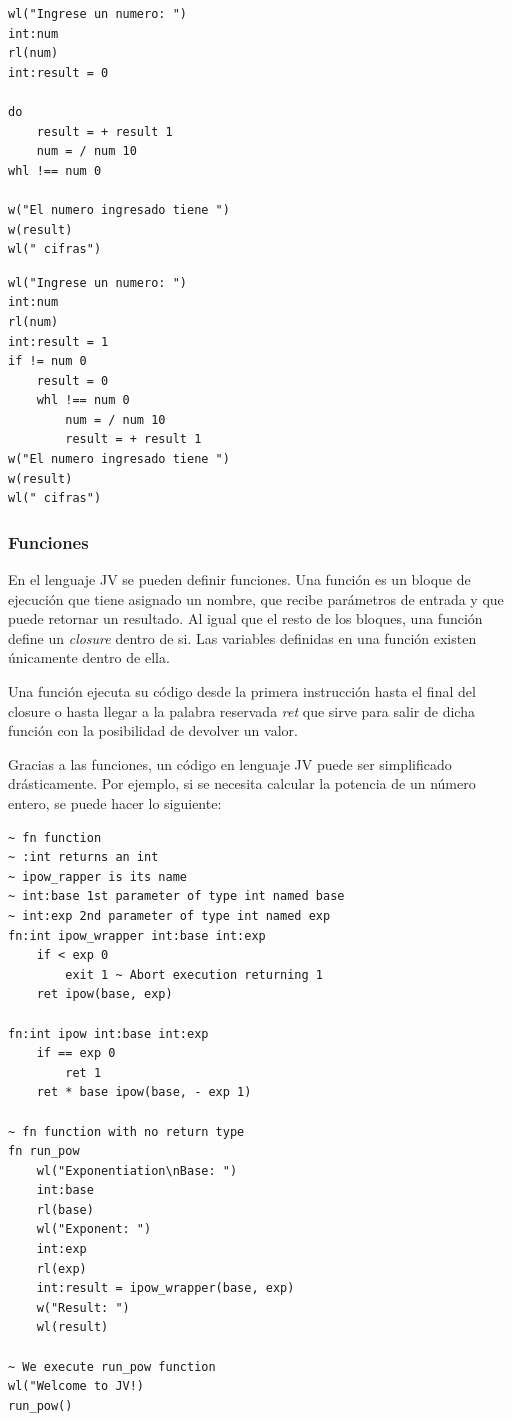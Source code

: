 \documentclass{article}
\begin{document}
                \begin{lstlisting}
wl("Ingrese un numero: ")
int:num
rl(num)
int:result = 0

do
    result = + result 1
    num = / num 10
whl !== num 0

w("El numero ingresado tiene ")
w(result)
wl(" cifras")
                \end{lstlisting}
                \begin{lstlisting}
wl("Ingrese un numero: ")
int:num
rl(num)
int:result = 1
if != num 0
    result = 0
    whl !== num 0
        num = / num 10
        result = + result 1
w("El numero ingresado tiene ")
w(result)
wl(" cifras")
                \end{lstlisting}

            \subsubsection{Funciones}
                \par En el lenguaje JV se pueden definir funciones. Una función es un bloque de ejecución que tiene asignado un nombre, que recibe parámetros de entrada y que puede retornar un resultado. Al igual que el resto de los bloques, una función define un \textit{closure} dentro de si. Las variables definidas en una función existen únicamente dentro de ella.
                \par Una función ejecuta su código desde la primera instrucción hasta el final del closure o hasta llegar a la palabra reservada \textit{ret} que sirve para salir de dicha función con la posibilidad de devolver un valor.
                \par Gracias a las funciones, un código en lenguaje JV puede ser simplificado drásticamente. Por ejemplo, si se necesita calcular la potencia de un número entero, se puede hacer lo siguiente:
                \begin{lstlisting}
~ fn function
~ :int returns an int
~ ipow_rapper is its name
~ int:base 1st parameter of type int named base
~ int:exp 2nd parameter of type int named exp
fn:int ipow_wrapper int:base int:exp
	if < exp 0
		exit 1 ~ Abort execution returning 1
	ret ipow(base, exp)

fn:int ipow int:base int:exp
	if == exp 0
		ret 1
	ret * base ipow(base, - exp 1)

~ fn function with no return type
fn run_pow
    wl("Exponentiation\nBase: ")
    int:base
    rl(base)
    wl("Exponent: ")
    int:exp
    rl(exp)
    int:result = ipow_wrapper(base, exp)
    w("Result: ")
    wl(result)

~ We execute run_pow function
wl("Welcome to JV!)
run_pow()
                \end{lstlisting}
\end{document}
